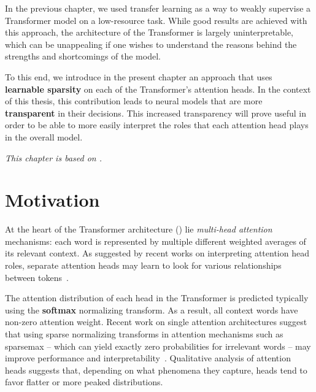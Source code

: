 \label{chap:adaptsparse}

\cleardoublepage
{}

In the previous chapter, we used transfer learning as a way
to weakly supervise a Transformer model on a low-resource task.
While good results are achieved with this approach, the
architecture of the Transformer is largely uninterpretable,
which can be unappealing if one wishes to understand the
reasons behind the strengths and shortcomings of the model.

To this end, we introduce in the present chapter an approach that
uses \textbf{learnable sparsity} on each of the Transformer's
attention heads. In the context of this thesis, this contribution
leads to neural models that are more \textbf{transparent} in their
decisions. This increased transparency will prove useful in order to
be able to more easily interpret the roles that each attention head
plays in the overall model.

\textit{This chapter is based on \citet{correia2019adaptively}.}

\section{Motivation}

At the heart of the Transformer architecture
() lie \emph{multi-head attention}
mechanisms: each word is represented by multiple different weighted
averages of its relevant context. As suggested by recent works on
interpreting attention head roles, separate attention heads may learn
to look for various relationships between
tokens~\citep{tang2018why,raganato2018analysis,
    marecek-rosa-2018-extracting,bert-rediscovers,specialized}.

The attention distribution of each head in the Transformer is
predicted typically using the \textbf{softmax} normalizing transform.
As a result, all context words have non-zero attention weight. Recent
work on single attention architectures suggest that using sparse
normalizing transforms in attention mechanisms such as sparsemax --
which can yield exactly zero probabilities for irrelevant words --
may improve performance and
interpretability~\citep{malaviya2018sparse,deng2018latent,entmax}.
Qualitative analysis of attention heads
\citep[Figure~5]{vaswani2017attention} suggests that, depending on
what phenomena they capture, heads tend to favor flatter or more
peaked distributions.


